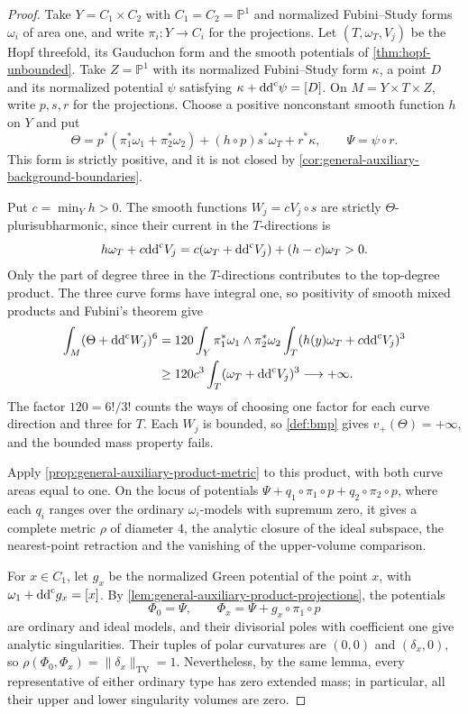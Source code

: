 \begin{proof}
Take $Y=C_1\times C_2$ with $C_1=C_2=\mathbb P^1$ and normalized Fubini--Study forms $\omega_i$ of area one, and write $\pi_i\colon Y\to C_i$ for the projections. Let $(T,\omega_T,V_j)$ be the Hopf threefold, its Gauduchon form and the smooth potentials of \cref{thm:hopf-unbounded}. Take $Z=\mathbb P^1$ with its normalized Fubini--Study form $\kappa$, a point $D$ and its normalized potential $\psi$ satisfying $\kappa+\mathrm{dd}^{\mathrm{c}}\psi=[D]$. On $M=Y\times T\times Z$, write $p,s,r$ for the projections. Choose a positive nonconstant smooth function $h$ on $Y$ and put
\[
 \Theta=p^*(\pi_1^*\omega_1+\pi_2^*\omega_2)
          +(h\circ p)s^*\omega_T+r^*\kappa,
 \qquad \Psi=\psi\circ r.
\]
This form is strictly positive, and it is not closed by \cref{cor:general-auxiliary-background-boundaries}.

Put $c=\min_Yh>0$. The smooth functions $W_j=cV_j\circ s$ are strictly $\Theta$-plurisubharmonic, since their current in the $T$-directions is
\[
 h\omega_T+c\mathrm{dd}^{\mathrm{c}} V_j
    =c(\omega_T+\mathrm{dd}^{\mathrm{c}} V_j)+(h-c)\omega_T>0.
\]
Only the part of degree three in the $T$-directions contributes to the top-degree product. The three curve forms have integral one, so positivity of smooth mixed products and Fubini's theorem give
\[
 \begin{aligned}
 \int_M(\Theta+\mathrm{dd}^{\mathrm{c}} W_j)^6
 &=120\int_Y\pi_1^*\omega_1\wedge\pi_2^*\omega_2
                  \int_T(h(y)\omega_T+c\mathrm{dd}^{\mathrm{c}} V_j)^3\\
 &\geq120c^3\int_T(\omega_T+\mathrm{dd}^{\mathrm{c}} V_j)^3
       \longrightarrow+\infty.
 \end{aligned}
\]
The factor $120=6!/3!$ counts the ways of choosing one factor for each curve direction and three for $T$. Each $W_j$ is bounded, so \cref{def:bmp} gives $v_+(\Theta)=+\infty$, and the bounded mass property fails.

Apply \cref{prop:general-auxiliary-product-metric} to this product, with both curve areas equal to one. On the locus of potentials $\Psi+q_1\circ\pi_1\circ p+q_2\circ\pi_2\circ p$, where each $q_i$ ranges over the ordinary $\omega_i$-models with supremum zero, it gives a complete metric $\rho$ of diameter $4$, the analytic closure of the ideal subspace, the nearest-point retraction and the vanishing of the upper-volume comparison.

For $x\in C_1$, let $g_x$ be the normalized Green potential of the point $x$, with $\omega_1+\mathrm{dd}^{\mathrm{c}} g_x=[x]$. By \cref{lem:general-auxiliary-product-projections}, the potentials
\[
 \Phi_0=\Psi,\qquad
 \Phi_x=\Psi+g_x\circ\pi_1\circ p
\]
are ordinary and ideal models, and their divisorial poles with coefficient one give analytic singularities. Their tuples of polar curvatures are $(0,0)$ and $(\delta_x,0)$, so $\rho(\Phi_0,\Phi_x)=\|\delta_x\|_{\mathrm{TV}}=1$. Nevertheless, by the same lemma, every representative of either ordinary type has zero extended mass; in particular, all their upper and lower singularity volumes are zero.
\end{proof}
